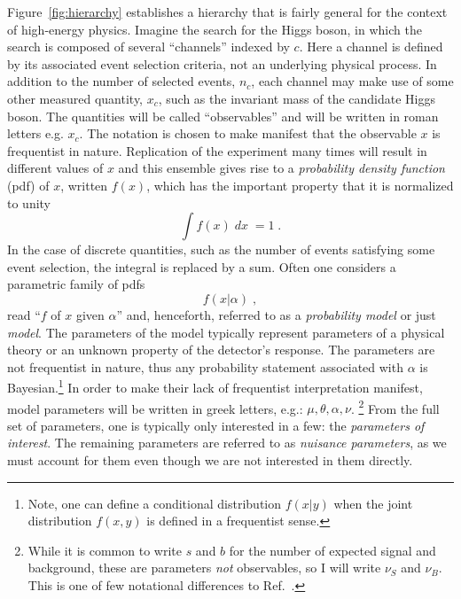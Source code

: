 \documentclass{cernrep}
\begin{document}
Figure~\ref{fig:hierarchy} establishes a hierarchy that is fairly general for the context of high-energy physics.  Imagine the search for the Higgs boson, in which the search is composed of several ``channels'' indexed by $c$.  Here a channel is defined by its associated event selection criteria, not an underlying physical process.  In addition to the number of selected events, $n_c$, each channel may make use of some other measured quantity, $x_c$, such as the invariant mass of the candidate Higgs boson. The quantities will be called ``observables'' and will be written in roman letters e.g. $x_c$. The notation is chosen to make manifest that the observable $x$ is  frequentist in nature.  Replication of the experiment many times will result in different values of $x$ and this ensemble gives rise to a \emph{probability density function} (pdf) of $x$, written $f(x)$, which has the important property that it is normalized to unity
\[
\int  f(x) \;dx\;= 1\;.
\]
In the case of discrete quantities, such as the number of events satisfying some event selection, the integral is replaced by a sum.  Often one considers a parametric family of pdfs
\[
f(x | \alpha) \;,
\]
read ``$f$ of $x$ given $\alpha$''  and, henceforth, referred to as a \emph{probability model} or just \emph{model}.  The parameters of the model typically represent parameters of a physical theory or an unknown property of the detector's response.  The parameters are not frequentist in nature, thus any probability statement associated with $\alpha$ is Bayesian.\footnote{Note, one can define a conditional distribution $f(x|y)$ when the joint distribution $f(x,y)$ is defined in a frequentist sense.}  In order to make their lack of frequentist interpretation manifest, model parameters will be written in greek letters, e.g.: $\mu, \theta, \alpha, \nu$.%
%
 \footnote{While it is common to write $s$ and $b$ for the number of expected signal and background, these are parameters \emph{not} observables, so I will write $\nu_S$ and $\nu_B$.  This is one of few notational differences to Ref.~\cite{asimov}.}
From the full set of parameters, one is typically only interested in a few: the \emph{parameters of interest}.  The remaining parameters are  referred to as \emph{nuisance parameters}, as we must account for them even though we are not interested in them directly.
\end{document}
